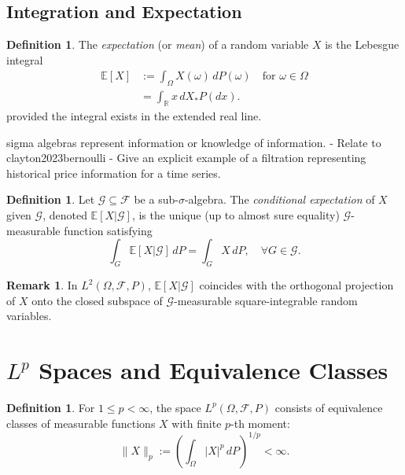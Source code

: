 \documentclass[11pt,reqno]{amsart}
\theoremstyle{definition}
\newtheorem{definition}[theorem]{Definition}
\newtheorem{remark}[theorem]{Remark}
\theoremstyle{remark}
\begin{document}
\subsection{Integration and Expectation}

\begin{definition}
	The \emph{expectation} (or \emph{mean}) of a random variable $X$ is the Lebesgue integral
	\begin{align}
		\mathbb{E}[X]
		 & := \int_\Omega X(\omega) \, dP(\omega) \quad \text{for } \omega \in \Omega \nonumber \\
		 & = \int_{\mathbb{R}} x \, dX_*P(dx).
	\end{align}
	provided the integral exists in the extended real line.
\end{definition}

sigma algebras represent information or knowledge of information.
- Relate to clayton2023bernoulli
- Give an explicit example of a filtration representing historical price information for a time series.

\begin{definition}
	Let $\mathcal{G} \subseteq \mathcal{F}$ be a sub-$\sigma$-algebra. The \emph{conditional expectation} of $X$ given $\mathcal{G}$, denoted $\mathbb{E}[X|\mathcal{G}]$, is the unique (up to almost sure equality) $\mathcal{G}$-measurable function satisfying
	\[
		\int_G \mathbb{E}[X|\mathcal{G}] \, dP = \int_G X \, dP, \quad \forall G \in \mathcal{G}.
	\]
\end{definition}

\begin{remark}
	In $L^2(\Omega, \mathcal{F}, P)$, $\mathbb{E}[X|\mathcal{G}]$ coincides with the orthogonal projection of $X$ onto the closed subspace of $\mathcal{G}$-measurable square-integrable random variables.
\end{remark}

\section{\texorpdfstring{$L^p$}{Lp} Spaces and Equivalence Classes}

\begin{definition}
	For $1 \leq p < \infty$, the space $L^p(\Omega, \mathcal{F}, P)$ consists of equivalence classes of measurable functions $X$ with finite $p$-th moment:
	\[
		\|X\|_p := \left( \int_\Omega |X|^p \, dP \right)^{1/p} < \infty.
	\]
\end{definition}
\end{document}
